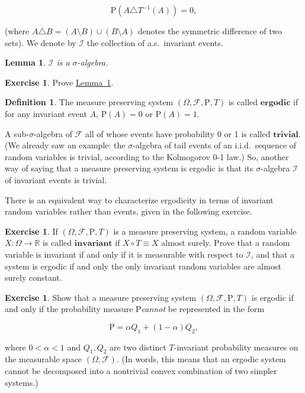 \documentclass[11pt]{report}
\newcommand{\R}{\mathbb{R}}
\theoremstyle{plain}
\newtheorem{lem}[thm]{Lemma}
\theoremstyle{definition}
\newtheorem{defn}[thm]{Definition}
\newtheorem{xexercise}[thm]{Exercise}
\begin{document}
\[
\mathrm{P}(A\triangle T^{-1}(A)) = 0,
\]

\noindent (where
$A\triangle B = (A\setminus B)\cup (B\setminus A)$
denotes the symmetric difference of two sets). We
denote by $\mathcal{I}$ the collection of a.s.\
invariant events.

\begin{lem}
\label{lem-invariant-sigmaalg}
$\mathcal{I}$ is a $\sigma$-algebra.
\end{lem}

\begin{xexercise}
Prove \hyperref[lem-invariant-sigmaalg]{Lemma~\ref*{lem-invariant-sigmaalg}}.
\end{xexercise}

\begin{defn}
The measure preserving system
$(\Omega, \mathcal{F}, \mathrm{P}, T)$ is called
$\textbf{ergodic}$ if for any invariant event $A$,
$\mathrm{P}(A)=0$ or $\mathrm{P}(A)=1$.
\end{defn}

\noindent A sub-$\sigma$-algebra of $\mathcal{F}$ all of whose
events have probability 0 or 1 is called
$\textbf{trivial}$. (We already saw an example: the
$\sigma$-algebra of tail events of an i.i.d.\
sequence of random variables is trivial, according to
the Kolmogorov 0-1 law.) So, another way of saying
that a measure preserving system is ergodic is that
its $\sigma$-algebra $\mathcal{I}$ of invariant
events is trivial.

There is an equivalent way to characterize ergodicity
in terms of invariant random variables rather than
events, given in the following exercise.

\begin{xexercise}
If $(\Omega, \mathcal{F}, \mathrm{P}, T)$ is a
measure preserving system, a random variable
$X:\Omega\to\R$ is called $\textbf{invariant}$ if
$X\circ T \equiv X$ almost surely. Prove that a
random variable is invariant if and only if it is
measurable with respect to $\mathcal{I}$, and that a
system is ergodic if and only the only invariant
random variables are almost surely constant.
\end{xexercise}

\begin{xexercise}
Show that a measure preserving system
$(\Omega, \mathcal{F}, \mathrm{P}, T)$ is ergodic if
and only if the probability measure $\mathrm{P}$\emph{cannot} be represented in the form

\[
\mathrm{P} = \alpha Q_1 + (1-\alpha)Q_2,
\]

\noindent where $0<\alpha<1$ and $Q_1, Q_2$ are two distinct
$T$-invariant probability measures on the measurable
space $(\Omega, \mathcal{F})$. (In words, this means
that an ergodic system cannot be decomposed into a
nontrivial convex combination of two simpler systems.)
\end{xexercise}
\end{document}
